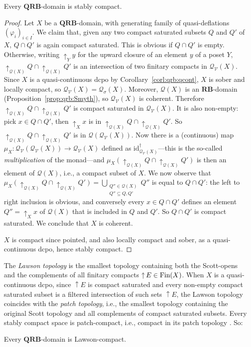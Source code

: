 \documentclass{LMCS}
\newcommand\Smyth{\mathcal Q}
\newcommand\V{{\mathcal V}}
\newcommand\SV{\Smyth_\V}
\newcommand\upc{\mathop{\uparrow}\nolimits}
\newcommand\QRB{\mathbf{QRB}}
\newcommand\RB{\mathbf{RB}}
\newcommand{\identity}[1]{\mathrm{id}_{#1}}
\begin{document}
\begin{thm}
  \label{thm:qrb:scomp}
  Every $\QRB$-domain is stably compact.
\end{thm}
\begin{proof}
  Let $X$ be a $\QRB$-domain, with generating family of
  quasi-deflations ${(\varphi_i)}_{i \in I}$.  We claim that, given
  any two compact saturated subsets $Q$ and $Q'$ of $X$, $Q \cap Q'$
  is again compact saturated.  This is obvious if $Q \cap Q'$ is
  empty.  Otherwise, writing $\upc_Y y$ for the upward closure of an
  element $y$ of a poset $Y$, $\upc_{\Smyth (X)} Q \cap \upc_{\Smyth
    (X)} Q'$ is an intersection of two finitary compacts in $\SV (X)$.
  Since $X$ is a quasi-continuous dcpo by
  Corollary~\ref{corl:qrb:qcont}, $X$ is sober and locally compact, so
  $\SV (X) = \Smyth_\sigma (X)$.  Moreover, $\Smyth (X)$ is an
  $\RB$-domain (Proposition~\ref{prop:qrb:Smyth}), so $\SV (X)$ is
  coherent.  Therefore $\upc_{\Smyth (X)} Q \cap \upc_{\Smyth (X)} Q'$
  is compact saturated in $\SV (X)$.  It is also non-empty: pick $x
  \in Q \cap Q'$, then $\upc_X x$ is in $\upc_{\Smyth (X)} Q \cap
  \upc_{\Smyth (X)} Q'$.  So $\upc_{\Smyth (X)} Q \cap \upc_{\Smyth
    (X)} Q'$ is in $\Smyth (\SV (X))$.  Now there is a (continuous)
  map $\mu_X : \SV (\SV (X)) \to \SV (X)$ defined as $\identity {\SV
    (X)}^\dagger$---this is the so-called {\em multiplication\/} of
  the monad---and $\mu_X (\upc_{\Smyth (X)} Q \cap \upc_{\Smyth (X)}
  Q')$ is then an element of $\Smyth (X)$, i.e., a compact subset of
  $X$.  We now observe that $\mu_X (\upc_{\Smyth (X)} Q \cap
  \upc_{\Smyth (X)} Q') = \bigcup_{\substack{Q'' \in \Smyth (X)\\Q''
      \subseteq Q, Q'}} Q''$ is equal to $Q \cap Q'$: the left to
  right inclusion is obvious, and conversely every $x \in Q \cap Q'$
  defines an element $Q'' = \upc_X x$ of $\Smyth (X)$ that is included
  in $Q$ and $Q'$.  So $Q \cap Q'$ is compact saturated.  We conclude
  that $X$ is coherent.

  $X$ is compact since pointed, and also locally compact and sober, as
  a quasi-continuous dcpo, hence stably compact.  \end{proof}


The {\em Lawson topology\/} is the smallest topology containing both
the Scott-opens and the complements of all finitary compacts $\upc E
\in \Fin (X)$.  When $X$ is a quasi-continuous dcpo, since $\upc E$ is
compact saturated and every non-empty compact saturated subset is a
filtered intersection of such sets $\upc E$, the Lawson topology
coincides with the {\em patch topology\/}, i.e., the smallest topology
containing the original Scott topology and all complements of compact
saturated subsets.  Every stably compact space is patch-compact, i.e.,
compact in its patch topology
\cite[Section~VI-6]{GHKLMS:contlatt}.  So:
\begin{cor}
  \label{corl:qrb:lcomp}
  Every $\QRB$-domain is Lawson-compact.
\end{cor}
\end{document}
